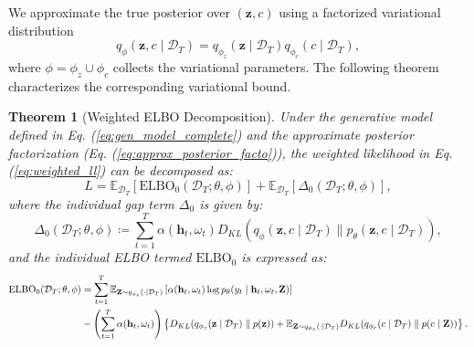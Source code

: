 \documentclass[10pt]{article} %
\newtheorem{theorem}{Theorem}
\begin{document}
We approximate the true posterior over \((\mathbf{z}, c)\) using a factorized variational distribution  
\begin{equation}
\label{eq:approx_posterior_facto}
q_{\phi}(\mathbf{z}, c \mid \mathcal{D}_T) = q_{\phi_z}(\mathbf{z} \mid \mathcal{D}_T) q_{\phi_c}(c \mid \mathcal{D}_T),
\end{equation}
where \(\phi = \phi_z \cup \phi_c\) collects the variational parameters. The following theorem characterizes the corresponding variational bound.
\begin{theorem}[Weighted ELBO Decomposition]
\label{thm:elbo_def}
Under the generative model defined in Eq. (\ref{eq:gen_model_complete}) and the approximate posterior factorization (Eq. (\ref{eq:approx_posterior_facto})), the weighted likelihood in Eq. (\ref{eq:weighted_ll}) can be decomposed as:
\begin{equation}
L = \mathbb{E}_{\mathcal{D}_T} \left[ \mathrm{ELBO_0}(\mathcal{D}_T; \theta, \phi) \right] + \mathbb{E}_{\mathcal{D}_T}\left[\Delta_0(\mathcal{D}_T; \theta, \phi)\right],
\end{equation}
where the individual gap term \(\Delta_0\) is given by:
\begin{equation}
\label{eq:indiv_gap}
    \Delta_0(\mathcal{D}_T; \theta, \phi) \coloneqq \sum_{t = 1}^{T} \alpha(\mathbf{h}_t, \omega_t) D_{KL}(q_{\phi}(\mathbf{z}, c \mid \mathcal{D}_T) \parallel p_{\theta}(\mathbf{z}, c \mid \mathcal{D}_T)),
\end{equation}
and the individual ELBO termed \(\mathrm{ELBO_0}\) is expressed as:
\begin{align}
\mathrm{ELBO_0}(\mathcal{D}_T; \theta, \phi) &=  \sum_{t = 1}^{T} \mathbb{E}_{\mathbf{Z} \sim q_{\phi_z}(\cdot \mid \mathcal{D}_T)} \left[ \alpha(\mathbf{h}_t, \omega_t) \log p_{\theta}(y_{t} \mid \mathbf{h}_t, \omega_t, \mathbf{Z}) \right] \label{eq:elbo_orig}\\
&- \left( \sum_{t = 1}^{T} \alpha(\mathbf{h}_t, \omega_t) \right) \left\{ D_{KL}(q_{\phi_z}(\mathbf{z} \mid \mathcal{D}_T) \parallel p(\mathbf{z}))  + \mathbb{E}_{\mathbf{Z} \sim q_{\phi_z}(\cdot \mid \mathcal{D}_T)} D_{KL}(q_{\phi_c}(c \mid \mathcal{D}_T) \parallel p(c \mid \mathbf{Z}) ) \right\}. \notag 
\end{align}
\end{theorem}
\end{document}
